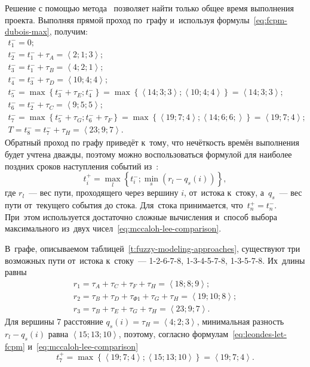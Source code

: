 Решение с помощью метода~\cite{Uskov_FCPM, Dubois_Prade} позволяет найти только общее время выполнения проекта. Выполняя прямой проход по~графу и~используя формулы~\eqref{eq:fcpm-dubois-max}, получим:
\begin{gather*}
  t_1^{-} = 0; \\
  t_2^{-} = t_1^{-}+\tau_A = \left \langle 2;1;3 \right \rangle; \\
  t_3^{-} = t_1^{-}+\tau_B = \left \langle 4;2;1 \right \rangle; \\
  t_4^{-} = t_3^{-}+\tau_D = \left \langle 10;4;4 \right \rangle; \\
  t_5^{-} = \max \left \{ t_3^{-}+\tau_E; t_4^{-} \right \} = \max \left\{ \left \langle 14;3;3 \right \rangle; \left \langle 10;4;4 \right \rangle \right\} = \left \langle 14;3;3 \right \rangle; \\
  t_6^{-} = t_2^{-}+\tau_C = \left \langle 9;5;5 \right \rangle; \\
  t_7^{-} = \max \left \{ t_5^{-}+\tau_G; t_6^{-}+\tau_F \right \} = \max \left\{ \left \langle 19;7;4 \right \rangle; \left \langle 14;6;6; \right \rangle \right\} = \left \langle 19;7;4 \right \rangle; \\
  T = t_8^{-} = t_7^{-} + \tau_H = \left \langle 23;9;7 \right \rangle.
\end{gather*}
Обратный проход по графу приведёт к~тому, что нечёткость времён выполнения будет учтена дважды, поэтому можно воспользоваться формулой для наиболее поздних сроков наступления событий из~\cite{Leondes}:
\begin{equation}
\label{eq:leondes-let-fcpm}
  t_i^{+} = \underset{l}{\max} \left\{ t_i^{-}; \underset{s}{\min} \left(r_l - q_s\left(i \right) \right) \right \},
\end{equation}
где $r_l$~--- вес пути, проходящего через вершину $i$, от~истока к~стоку, а~$q_s$~--- вес пути от~текущего события до стока. Для~стока принимается, что~$t_n^{+}=t_n^{-}$. При~этом используется достаточно сложные вычисления и~способ выбора максимального из~двух чисел~\eqref{eq:mccaloh-lee-comparison}.

В~графе, описываемом таблицей~\ref{t:fuzzy-modeling-approaches}, существуют три возможных пути от~истока к~стоку~--- 1-2-6-7-8, 1-3-4-5-7-8, 1-3-5-7-8. Их~длины равны
\begin{gather*}
  r_1 = \tau_A+\tau_C+\tau_F+\tau_H = \left \langle 18; 8; 9 \right \rangle; \\
  r_2 = \tau_B+\tau_D+\tau_{\Phi 1}+\tau_G+\tau_H = \left \langle 19; 10; 8 \right \rangle; \\
  r_3 = \tau_B+\tau_E+\tau_G+\tau_H = \left \langle 23; 9; 7 \right \rangle.
\end{gather*}
Для вершины 7 расстояние $q_s\left(i\right) = \tau_H = \left \langle 4;2;3  \right \rangle$, минимальная разность $r_l - q_s\left(i \right)$ равна $\left \langle 15; 13; 10 \right \rangle$, поэтому, согласно формулам~\eqref{eq:leondes-let-fcpm} и~\eqref{eq:mccaloh-lee-comparison}
\begin{equation*}
  t_7^{+}=\max \left\{ \left \langle 19;7;4 \right \rangle; \left \langle 15;13;10 \right \rangle \right\} = \left \langle 19;7;4 \right \rangle.
\end{equation*}

